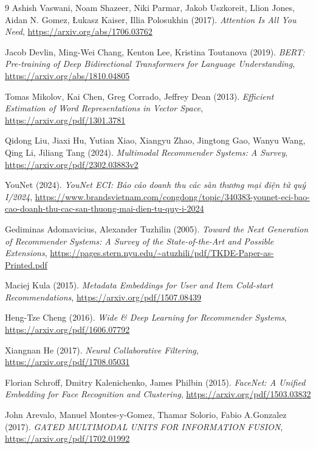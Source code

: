 \begin{thebibliography}{9}
     Ashish Vaswani, Noam Shazeer, Niki Parmar, Jakob Uszkoreit, Llion Jones, Aidan N. Gomez, Łukasz Kaiser, Illia Polosukhin (2017). \textit{Attention Is All You Need}, \url{https://arxiv.org/abs/1706.03762}

     Jacob Devlin, Ming-Wei Chang, Kenton Lee, Kristina Toutanova (2019). \textit{BERT: Pre-training of Deep Bidirectional Transformers for Language Understanding}, \url{https://arxiv.org/abs/1810.04805}

     Tomas Mikolov, Kai Chen, Greg Corrado, Jeffrey Dean (2013). \textit{Efficient Estimation of Word Representations in Vector Space}, \url{https://arxiv.org/pdf/1301.3781}

     Qidong Liu, Jiaxi Hu, Yutian Xiao, Xiangyu Zhao, Jingtong Gao, Wanyu Wang, Qing Li, Jiliang Tang (2024). \textit{Multimodal Recommender Systems: A Survey}, \url{https://arxiv.org/pdf/2302.03883v2}
     
     YouNet (2024). \textit{YouNet ECI: Báo cáo doanh thu các sàn thương mại điện tử quý I/2024}, \url{https://www.brandsvietnam.com/congdong/topic/340383-younet-eci-bao-cao-doanh-thu-cac-san-thuong-mai-dien-tu-quy-i-2024}
     
    Gediminas Adomavicius, Alexander Tuzhilin (2005). \textit{Toward the Next Generation of Recommender Systems: A Survey of the State-of-the-Art and Possible Extensions}, \url{https://pages.stern.nyu.edu/~atuzhili/pdf/TKDE-Paper-as-Printed.pdf}

    Maciej Kula (2015). \textit{Metadata Embeddings for User and Item Cold-start Recommendations}, \url{https://arxiv.org/pdf/1507.08439}

    Heng-Tze Cheng (2016). \textit{Wide \& Deep Learning for Recommender Systems}, \url{https://arxiv.org/pdf/1606.07792}

    Xiangnan He (2017). \textit{Neural Collaborative Filtering}, \url{https://arxiv.org/pdf/1708.05031}

    Florian Schroff, Dmitry Kalenichenko, James Philbin (2015). \textit{FaceNet: A Unified Embedding for Face Recognition and Clustering}, \url{https://arxiv.org/pdf/1503.03832}

    John Arevalo, Manuel Montes-y-Gomez, Thamar Solorio, Fabio A.Gonzalez (2017). \textit{GATED MULTIMODAL UNITS FOR INFORMATION FUSION}, \url{https://arxiv.org/pdf/1702.01992}


\end{thebibliography}
